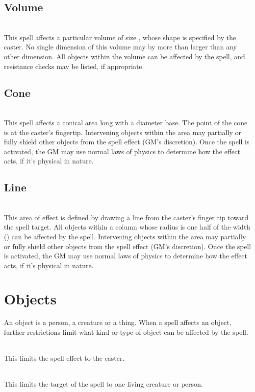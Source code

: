 \begin{multicols}{2}
\subsection{Volume}
\\
This spell affects a particular volume of size , whose shape is specified by the caster. No single dimension of this volume may by more than  larger than any other dimension. All objects within the volume can be affected by the spell, and resistance checks may be listed, if appropriate.
\subsection{Cone}
\\
This spell affects a conical area  long with a  diameter base. The point of the cone is at the caster's fingertip. Intervening objects within the area may partially or fully shield other objects from the spell effect (GM's discretion). Once the spell is activated, the GM may use normal laws of physics to determine how the effect acts, if it's physical in nature.
\subsection{Line}
\\
This area of effect is defined by drawing a line from the caster's finger tip  toward the spell target. All objects within a column whose radius is one half of the width () can be affected by the spell. Intervening objects within the area may partially or fully shield other objects from the spell effect (GM's discretion). Once the spell is activated, the GM may use normal laws of physics to determine how the effect acts, if it's physical in nature.
\section{Objects}
An object is a person, a creature or a thing. When a spell affects an object, further restrictions limit what kind or type of object can be affected by the spell.

\\
This limits the spell effect to the caster.

\\
This limits the target of the spell to one living creature or person.


\end{multicols}
